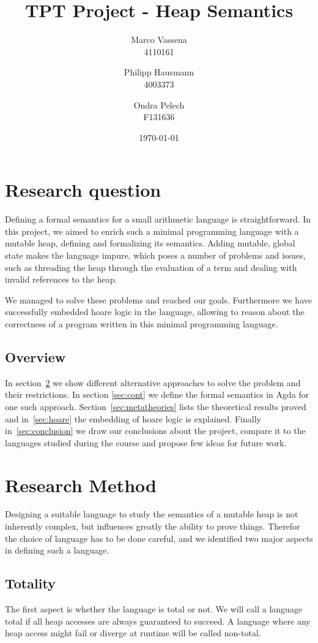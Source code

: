 \documentclass[12pt, a4paper, oneside]{article}
\title{TPT Project - Heap Semantics}
\author{Marco Vassena  \\
    4110161 \\
    \and
    Philipp Hausmann \\
    4003373 \\
    \and
    Ondra Pelech \\
    F131636 \\
    }
\date{\today}
\begin{document}
\maketitle

\tableofcontents


\section{Research question}
Defining a formal semantics for a small arithmetic language is straightforward. In this project, we aimed to enrich such a
minimal programming language with a mutable heap, defining and formalizing its semantics. Adding mutable, global state makes
the language impure, which  poses a number of problems and issues, such as threading the heap through the evaluation of a term
and dealing with invalid references to the heap.

We managed to solve these problems and reached our goals. Furthermore we have successfully embedded hoare logic in the language,
allowing to reason about the correctness of a program written in this minimal programming language.

\subsection{Overview}
In section~\ref{sec:method} we show different alternative approaches to solve the problem and their restrictions. 
In section \ref{sec:cont} we define the formal semantics in Agda for one such approach.
Section~\ref{sec:metatheories} lists the theoretical results proved and in~\ref{sec:hoare} the embedding of hoare logic is explained.
Finally in~\ref{sec:conclusion} we draw our conclusions about the project, compare it to the languages studied during the course and propose few ideas for future work.

\section{Research Method}
\label{sec:method}
Designing a suitable language to study the semantics of a mutable heap is not inherently complex, but influences greatly
the ability to prove things. Therefor the choice of language has to be done careful, and we identified two
major aspects in defining such a language.

\subsection{Totality}
The first aspect is whether the language is total or not. We will call a language total if all heap accesses are always guaranteed
to succeed. A language where any heap access might fail or diverge at runtime will be called non-total.
\end{document}
